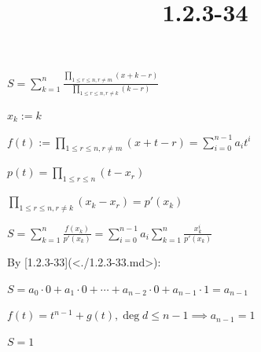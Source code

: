 \documentclass{article}
\title{1.2.3-34}
\begin{document}
\maketitle

$S = \sum_{k=1}^n \frac{\prod_{1 \leq r \leq n, r \neq m} (x + k - r)}{\prod_{1 \leq r \leq n, r \neq k} (k - r)}$

$x_k := k$

$f(t) := \prod_{1 \leq r \leq n, r \neq m} (x + t - r) = \sum_{i=0}^{n-1} a_it^i$

$p(t) = \prod_{1 \leq r \leq n} (t-x_r)$

$\prod_{1 \leq r \leq n, r \neq k} (x_k - x_r) = p'(x_k)$

$S = \sum_{k=1}^n \frac{f(x_k)}{p'(x_k)} = \sum_{i=0}^{n-1} a_i \sum_{k=1}^n \frac{x_k^i}{p'(x_k)}$

By [1.2.3-33](<./1.2.3-33.md>):

$S = a_0 \cdot 0 + a_1 \cdot 0 + \cdots + a_{n-2} \cdot 0 + a_{n-1} \cdot 1 = a_{n-1}$

$f(t) = t^{n-1} + g(t), \deg d \leq n - 1 \implies a_{n-1} = 1$

$S = 1$
\end{document}
